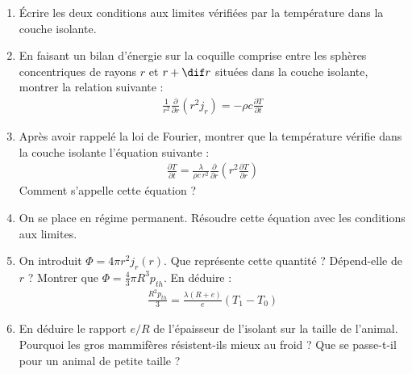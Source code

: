 \begin{enumerate}

	\item Écrire les deux conditions aux limites vérifiées par la température dans la couche isolante.

	\item En faisant un bilan d'énergie sur la coquille comprise entre les sphères concentriques de rayons $r$ et $r+\dif r$ situées dans la couche isolante, montrer la relation suivante :
	\begin{align*}
		\frac{1}{r^2}\frac{\partial }{\partial r}\left( r^2j_r\right) =-\rho c\frac{\partial T}{\partial t}
	\end{align*}

	\item Après avoir rappelé la loi de Fourier, montrer que la température vérifie dans la couche isolante l'équation suivante :
	\begin{align*}
		\frac{\partial T}{\partial t}=\frac{\lambda}{\rho c\, r^2}\frac{\partial }{\partial r}\left( r^2\frac{\partial T}{\partial r}\right)
	\end{align*}
	Comment s'appelle cette équation ?

	\item On se place en régime permanent. Résoudre cette équation avec les conditions aux limites.

	\item On introduit $\Phi=4\pi r^2j_r(r)$. Que représente cette quantité ? Dépend-elle de $r$ ? Montrer que $\Phi=\frac{4}{3}\pi R^3p_{th}$. En déduire :
	\begin{align*}
		\frac{R^2p_{th}}{3}=\frac{\lambda (R+e)}{e}(T_1-T_0)
	\end{align*}

	\item En déduire le rapport $e/R$ de l'épaisseur de l'isolant sur la taille de l'animal. Pourquoi les gros mammifères résistent-ils mieux au froid ? Que se passe-t-il pour un animal de petite taille ?

\end{enumerate}

\newpage

